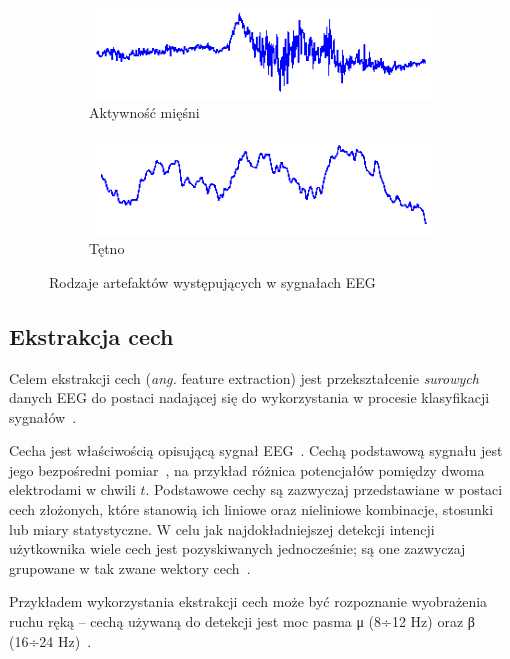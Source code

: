 \documentclass[skorowidz,skroty]{dyplomWEZUT}
\begin{document}
\begin{figure}[htb]
    \medskip
    \begin{subfigure}{0.48\textwidth}
    \includegraphics[width=\linewidth]{graphic/eeg_noise_muscle}
    \caption{Aktywność mięśni}
    \end{subfigure}\hspace*{\fill}
    \begin{subfigure}{0.48\textwidth}
    \includegraphics[width=\linewidth]{graphic/eeg_noise_pulse}
    \caption{Tętno}
    \end{subfigure}
    
    \caption{Rodzaje artefaktów występujących w sygnałach EEG\label{fig:eeg_noise}}
\end{figure}


\subsection{Ekstrakcja cech}
Celem ekstrakcji cech (\textit{ang.} feature extraction) jest przekształcenie \textit{surowych} danych EEG do postaci nadającej się do wykorzystania w procesie klasyfikacji sygnałów~\cite{bci_robotics}.

Cecha jest właściwością opisującą sygnał EEG~\cite{bci_foundations}. Cechą podstawową sygnału jest jego bezpośredni pomiar~\cite{bci_principles}, na przykład różnica potencjałów pomiędzy dwoma elektrodami w chwili $t$. Podstawowe cechy są zazwyczaj przedstawiane w postaci cech złożonych, które stanowią ich liniowe oraz nieliniowe kombinacje, stosunki lub miary statystyczne. W celu jak najdokładniejszej detekcji intencji użytkownika wiele cech jest pozyskiwanych jednocześnie; są one zazwyczaj grupowane w tak zwane wektory cech~\cite{bci_foundations}. 

Przykładem wykorzystania ekstrakcji cech może być rozpoznanie wyobrażenia ruchu ręką -- cechą używaną do detekcji jest moc pasma μ (8÷12 Hz) oraz β (16÷24 Hz)~\cite{bci_foundations}.
\end{document}
